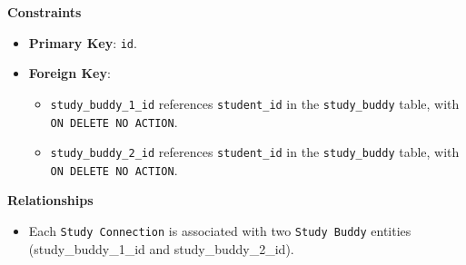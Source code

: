 \documentclass[12pt]{article}
\begin{document}
    \noindent 
    \textbf{Constraints}
    \begin{itemize} 
        \item \textbf{Primary Key}: \texttt{id}. 
        \item \textbf{Foreign Key}: \begin{itemize} \item \texttt{study\_buddy\_1\_id} references \texttt{student\_id} in the \texttt{study\_buddy} table, with \texttt{ON DELETE NO ACTION}. 
        \item \texttt{study\_buddy\_2\_id} references \texttt{student\_id} in the \texttt{study\_buddy} table, with \texttt{ON DELETE NO ACTION}. 
        \end{itemize} 
    \end{itemize}

    \noindent 
    \textbf{Relationships} 
    \begin{itemize} 
        \item Each \texttt{Study Connection} is associated with two \texttt{Study Buddy} entities (study\_buddy\_1\_id and study\_buddy\_2\_id). 
    \end{itemize}
\end{document}
